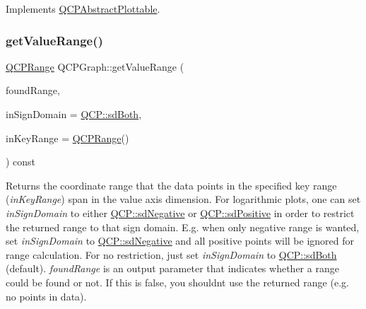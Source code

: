 Implements \hyperlink{classQCPAbstractPlottable_a4da16d3cd4b509e1104a9b0275623c96}{Q\+C\+P\+Abstract\+Plottable}.

\mbox{\label{classQCPGraph_a8f773e56f191a61c06e129e90a604d77}} 
\subsubsection{\texorpdfstring{get\+Value\+Range()}{getValueRange()}}
{\footnotesize\ttfamily \hyperlink{classQCPRange}{Q\+C\+P\+Range} Q\+C\+P\+Graph\+::get\+Value\+Range (\begin{DoxyParamCaption}\item[{bool \&}]{found\+Range,  }\item[{\hyperlink{namespaceQCP_afd50e7cf431af385614987d8553ff8a9}{Q\+C\+P\+::\+Sign\+Domain}}]{in\+Sign\+Domain = {\ttfamily \hyperlink{namespaceQCP_afd50e7cf431af385614987d8553ff8a9aa38352ef02d51ddfa4399d9551566e24}{Q\+C\+P\+::sd\+Both}},  }\item[{const \hyperlink{classQCPRange}{Q\+C\+P\+Range} \&}]{in\+Key\+Range = {\ttfamily \hyperlink{classQCPRange}{Q\+C\+P\+Range}()} }\end{DoxyParamCaption}) const\hspace{0.3cm}{\ttfamily [virtual]}}

Returns the coordinate range that the data points in the specified key range ({\itshape in\+Key\+Range}) span in the value axis dimension. For logarithmic plots, one can set {\itshape in\+Sign\+Domain} to either \hyperlink{namespaceQCP_afd50e7cf431af385614987d8553ff8a9a2d18af0bc58f6528d1e82ce699fe4829}{Q\+C\+P\+::sd\+Negative} or \hyperlink{namespaceQCP_afd50e7cf431af385614987d8553ff8a9a584784b75fb816abcc627cf743bb699f}{Q\+C\+P\+::sd\+Positive} in order to restrict the returned range to that sign domain. E.\+g. when only negative range is wanted, set {\itshape in\+Sign\+Domain} to \hyperlink{namespaceQCP_afd50e7cf431af385614987d8553ff8a9a2d18af0bc58f6528d1e82ce699fe4829}{Q\+C\+P\+::sd\+Negative} and all positive points will be ignored for range calculation. For no restriction, just set {\itshape in\+Sign\+Domain} to \hyperlink{namespaceQCP_afd50e7cf431af385614987d8553ff8a9aa38352ef02d51ddfa4399d9551566e24}{Q\+C\+P\+::sd\+Both} (default). {\itshape found\+Range} is an output parameter that indicates whether a range could be found or not. If this is false, you shouldn\textquotesingle{}t use the returned range (e.\+g. no points in data).

